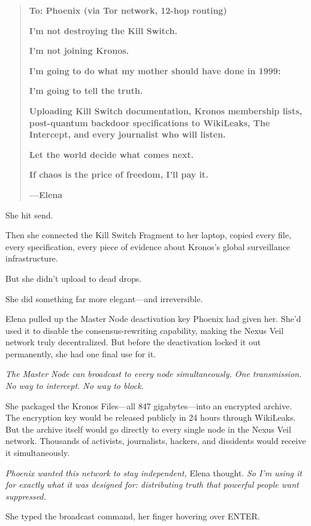 \documentclass[12pt,letterpaper]{book}
\begin{document}
\begin{quote}
\textbf{To: Phoenix (via Tor network, 12-hop routing)}

\textbf{I'm not destroying the Kill Switch.}

\textbf{I'm not joining Kronos.}

\textbf{I'm going to do what my mother should have done in 1999:}

\textbf{I'm going to tell the truth.}

\textbf{Uploading Kill Switch documentation, Kronos membership lists, post-quantum backdoor specifications to WikiLeaks, The Intercept, and every journalist who will listen.}

\textbf{Let the world decide what comes next.}

\textbf{If chaos is the price of freedom, I'll pay it.}

\textbf{---Elena}
\end{quote}

She hit send.

Then she connected the Kill Switch Fragment to her laptop, copied every file, every specification, every piece of evidence about Kronos's global surveillance infrastructure.

But she didn't upload to dead drops.

She did something far more elegant---and irreversible.

Elena pulled up the Master Node deactivation key Phoenix had given her. She'd used it to disable the consensus-rewriting capability, making the Nexus Veil network truly decentralized. But before the deactivation locked it out permanently, she had one final use for it.

\emph{The Master Node can broadcast to every node simultaneously. One transmission. No way to intercept. No way to block.}

She packaged the Kronos Files---all 847 gigabytes---into an encrypted archive. The encryption key would be released publicly in 24 hours through WikiLeaks. But the archive itself would go directly to every single node in the Nexus Veil network. Thousands of activists, journalists, hackers, and dissidents would receive it simultaneously.

\emph{Phoenix wanted this network to stay independent,} Elena thought. \emph{So I'm using it for exactly what it was designed for: distributing truth that powerful people want suppressed.}

She typed the broadcast command, her finger hovering over ENTER.
\end{document}
